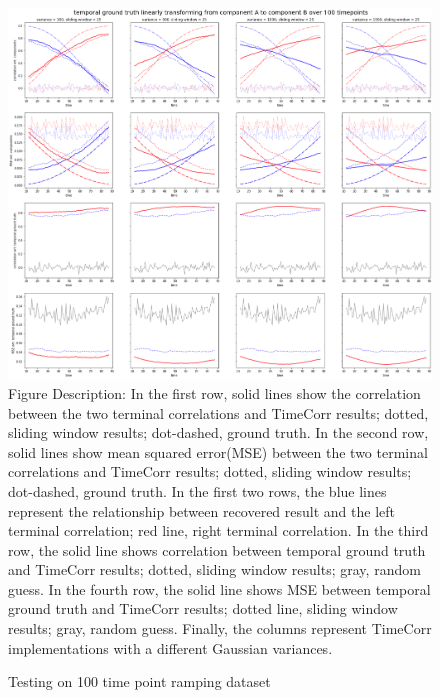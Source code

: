 \documentclass[11pt]{article}
\begin{document}
\begin{figure}[!htb]
\caption{Testing on 100 time point ramping dataset}
\includegraphics[width=1\textwidth]{../figures/SyntheticTesting/ramp100t4var.png}
\label{fig:ramp100t4var}
Figure Description: In the first row, solid lines show the correlation between the two terminal correlations and TimeCorr results; dotted, sliding window results; dot-dashed, ground truth. In the second row, solid lines show mean squared error(MSE) between the two terminal correlations and TimeCorr results; dotted, sliding window results; dot-dashed, ground truth. In the first two rows, the blue lines represent the relationship between recovered result and the left terminal correlation; red line, right terminal correlation. In the third row, the solid line shows correlation between temporal ground truth and TimeCorr results; dotted, sliding window results; gray, random guess. In the fourth row, the solid line shows MSE between temporal ground truth and TimeCorr results; dotted line, sliding window results; gray, random guess. Finally, the columns represent TimeCorr implementations with a different Gaussian variances.
\end{figure}
\end{document}
